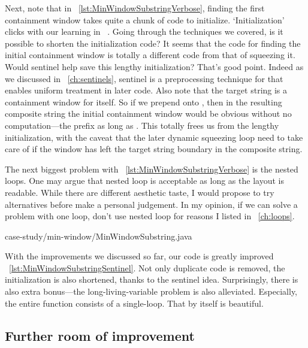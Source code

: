 Next, note that in ~\autoref{lst:MinWindowSubstringVerbose}, finding the first containment
window takes quite a chunk of code to initialize.
`Initialization' clicks with our learning in ~.
Going through the techniques we covered, is it possible to shorten the initialization code?
It seems that the code for finding the initial containment window is totally a different code
from that of squeezing it.
Would sentinel help save this lengthy initialization?
That's good point.
Indeed as we discussed in ~\autoref{ch:sentinels}, sentinel is a preprocessing technique for
that enables uniform treatment in later code.
Also note that the target string is a containment window for itself.
So if we prepend  onto , then in the resulting composite string the initial
containment window would be obvious without no computation---the prefix as long as .
This totally frees us from the lengthy initialization, with the caveat that the later dynamic
squeezing loop need to take care of if the window has left the target string boundary in the
composite string.

The next biggest problem with ~\autoref{lst:MinWindowSubstringVerbose} is the nested loops.
One may argue that nested loop is acceptable as long as the layout is readable.
While there are different aesthetic taste, I would propose to try alternatives before make a
personal judgement.
In my opinion, if we can solve a problem with one loop, don't use nested loop for reasons I
listed in ~\autoref{ch:loops}.


{case-study/min-window/MinWindowSubstring.java}

With the improvements we discussed so far, our code is greatly improved
~\autoref{lst:MinWindowSubstringSentinel}.
Not only duplicate code is removed, the initialization is also shortened, thanks to
the sentinel idea.
Surprisingly, there is also extra bonus---the long-living-variable problem is also alleviated.
Especially, the entire function consists of a single-loop.
That by itself is beautiful.

\subsection{Further room of improvement}

